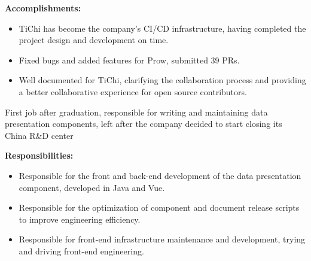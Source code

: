 \documentclass{resume}
\newcommand{\en}[1]{#1}
\newcommand{\zh}[1]{}
\begin{document}
\en{\textbf{Accomplishments:}}
\zh{\textbf{产出：}}
\begin{itemize}
      \item \en{TiChi has become the company's CI/CD infrastructure, having completed the project design and development on time.}
            \zh{按时完成了项目的设计和开发，TiChi 已经成为了公司 CI/CD 的基础设施。}
      \item \en{Fixed bugs and added features for Prow, submitted 39 PRs.}
            \zh{为 Prow 修复 bug 和添加功能，提交了 39 个 PR。}
      \item \en{Well documented for TiChi, clarifying the collaboration process and providing a better collaborative experience for open source contributors.}
            \zh{为 TiChi 编写了良好的文档，明确了协作流程，为开源贡献者提供了更好的协作体验。}
\end{itemize}

\en{}
\zh{\datedsubsection{\textbf{\href{https://www.morningstar.com/}{晨星资讯（Morningstar, Inc.）- 金融服务 - 前后端开发工程师}}}{2019/06 -- 2020/07}}
\en{First job after graduation, responsible for writing and maintaining data presentation components, left after the company decided to start closing its China R\&D center}
\zh{毕业后第一份工作，负责编写和维护数据展示组件，在公司决定开始关闭中国研发中心后离职}

\en{\textbf{Responsibilities:}}
\zh{\textbf{职责：}}
\begin{itemize}
      \item \en{Responsible for the front and back-end development of the data presentation component, developed in Java and Vue.}
            \zh{负责数据展示组件的前后端开发，使用 Java 和 Vue 开发。}
      \item \en{Responsible for the optimization of component and document release scripts to improve engineering efficiency.}
            \zh{负责组件和文档发布脚本的优化，提升工程效率。}
      \item \en{Responsible for front-end infrastructure maintenance and development, trying and driving front-end engineering.}
            \zh{负责前端基础设施维护和开发，尝试和推动前端工程化。}
\end{itemize}
\end{document}
